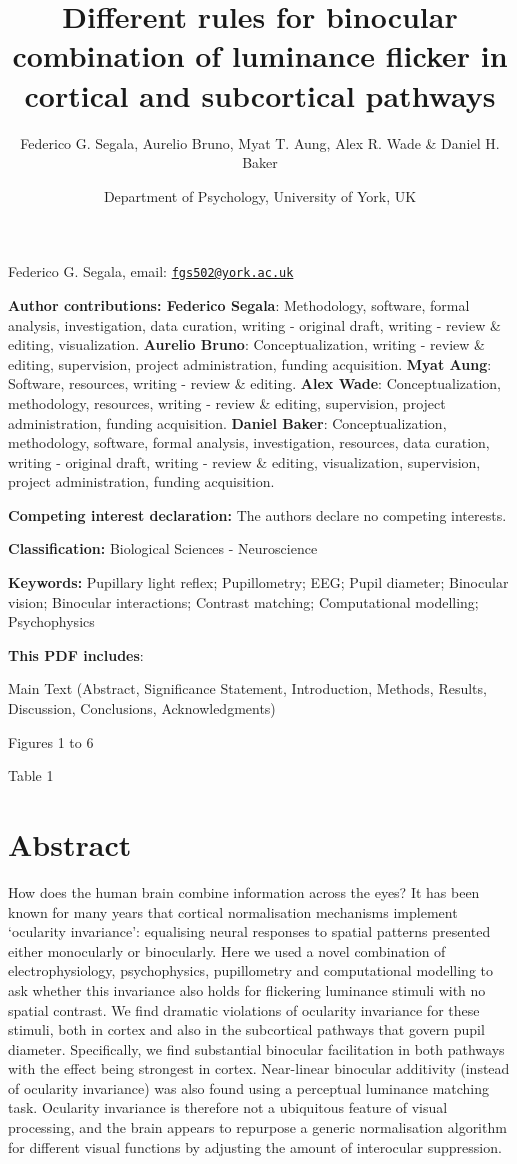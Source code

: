 \documentclass[
]{article}
\title{Different rules for binocular combination of luminance flicker in cortical and subcortical pathways}
\author{Federico G. Segala, Aurelio Bruno, Myat T. Aung, Alex R. Wade \& Daniel H. Baker}
\date{Department of Psychology, University of York, UK}
\begin{document}
\maketitle

Federico G. Segala, email: \href{mailto:fgs502@york.ac.uk}{\nolinkurl{fgs502@york.ac.uk}}

\textbf{Author contributions: Federico Segala}: Methodology, software, formal analysis, investigation, data curation, writing - original draft, writing - review \& editing, visualization. \textbf{Aurelio Bruno}: Conceptualization, writing - review \& editing, supervision, project administration, funding acquisition. \textbf{Myat Aung}: Software, resources, writing - review \& editing. \textbf{Alex Wade}: Conceptualization, methodology, resources, writing - review \& editing, supervision, project administration, funding acquisition. \textbf{Daniel Baker}: Conceptualization, methodology, software, formal analysis, investigation, resources, data curation, writing - original draft, writing - review \& editing, visualization, supervision, project administration, funding acquisition.

\textbf{Competing interest declaration:} The authors declare no competing interests.

\textbf{Classification:} Biological Sciences - Neuroscience

\textbf{Keywords:} Pupillary light reflex; Pupillometry; EEG; Pupil diameter; Binocular vision; Binocular interactions; Contrast matching; Computational modelling; Psychophysics

\textbf{This PDF includes}:

Main Text (Abstract, Significance Statement, Introduction, Methods, Results, Discussion, Conclusions, Acknowledgments)

Figures 1 to 6

Table 1

\hypertarget{abstract}{%
\section{Abstract}\label{abstract}}

How does the human brain combine information across the eyes? It has been known for many years that cortical normalisation mechanisms implement `ocularity invariance': equalising neural responses to spatial patterns presented either monocularly or binocularly. Here we used a novel combination of electrophysiology, psychophysics, pupillometry and computational modelling to ask whether this invariance also holds for flickering luminance stimuli with no spatial contrast. We find dramatic violations of ocularity invariance for these stimuli, both in cortex and also in the subcortical pathways that govern pupil diameter. Specifically, we find substantial binocular facilitation in both pathways with the effect being strongest in cortex. Near-linear binocular additivity (instead of ocularity invariance) was also found using a perceptual luminance matching task. Ocularity invariance is therefore not a ubiquitous feature of visual processing, and the brain appears to repurpose a generic normalisation algorithm for different visual functions by adjusting the amount of interocular suppression.
\end{document}
